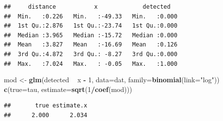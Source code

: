 \documentclass[12pt,]{book}
\newenvironment{Shaded}{\begin{snugshade}}{\end{snugshade}}
\newcommand{\DataTypeTok}[1]{\textcolor[rgb]{0.13,0.29,0.53}{#1}}
\newcommand{\DecValTok}[1]{\textcolor[rgb]{0.00,0.00,0.81}{#1}}
\newcommand{\KeywordTok}[1]{\textcolor[rgb]{0.13,0.29,0.53}{\textbf{#1}}}
\newcommand{\NormalTok}[1]{#1}
\newcommand{\OperatorTok}[1]{\textcolor[rgb]{0.81,0.36,0.00}{\textbf{#1}}}
\newcommand{\StringTok}[1]{\textcolor[rgb]{0.31,0.60,0.02}{#1}}
\begin{document}
\begin{verbatim}
##     distance           x             detected    
##  Min.   :0.226   Min.   :-49.33   Min.   :0.000  
##  1st Qu.:2.876   1st Qu.:-23.74   1st Qu.:0.000  
##  Median :3.965   Median :-15.72   Median :0.000  
##  Mean   :3.827   Mean   :-16.69   Mean   :0.126  
##  3rd Qu.:4.872   3rd Qu.: -8.27   3rd Qu.:0.000  
##  Max.   :7.024   Max.   : -0.05   Max.   :1.000
\end{verbatim}

\begin{Shaded}
\begin{Highlighting}[]
\NormalTok{mod <-}\StringTok{ }\KeywordTok{glm}\NormalTok{(detected }\OperatorTok{~}\StringTok{ }\NormalTok{x }\OperatorTok{-}\StringTok{ }\DecValTok{1}\NormalTok{, }\DataTypeTok{data=}\NormalTok{dat, }\DataTypeTok{family=}\KeywordTok{binomial}\NormalTok{(}\DataTypeTok{link=}\StringTok{"log"}\NormalTok{))}
\KeywordTok{c}\NormalTok{(}\DataTypeTok{true=}\NormalTok{tau, }\DataTypeTok{estimate=}\KeywordTok{sqrt}\NormalTok{(}\DecValTok{1}\OperatorTok{/}\KeywordTok{coef}\NormalTok{(mod)))}
\end{Highlighting}
\end{Shaded}

\begin{verbatim}
##       true estimate.x 
##      2.000      2.034
\end{verbatim}
\end{document}
